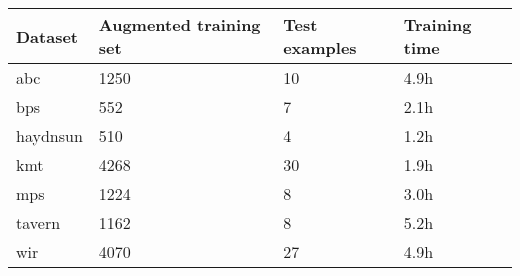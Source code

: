 \begin{tabular}{l|lll}
Dataset        & Augmented training set & Test examples & Training time \\ \hline
\gls{abc}      & 1250                   & 10            & 4.9h          \\
\gls{bps}      & 552                    & 7             & 2.1h          \\
\gls{haydnsun} & 510                    & 4             & 1.2h          \\
\gls{kmt}      & 4268                   & 30            & 1.9h          \\
\gls{mps}      & 1224                   & 8             & 3.0h          \\
\gls{tavern}   & 1162                   & 8             & 5.2h          \\
\gls{wir}      & 4070                   & 27            & 4.9h         
\end{tabular}
